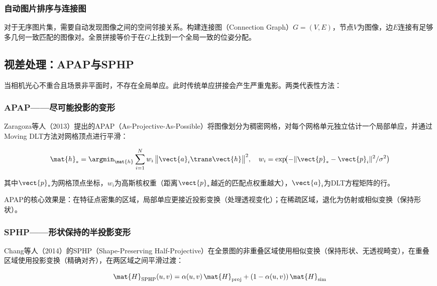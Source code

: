 \subsubsection{自动图片排序与连接图}

对于无序图片集，需要自动发现图像之间的空间邻接关系。构建连接图（Connection Graph）$G = (V, E)$，节点$V$为图像，边$E$连接有足够多几何一致匹配的图像对。全景拼接等价于在$G$上找到一个全局一致的位姿分配。

\subsection{视差处理：APAP与SPHP}
\label{sec:parallax}

当相机光心不重合且场景非平面时，不存在全局单应。此时传统单应拼接会产生严重鬼影。两类代表性方法：

\subsubsection{APAP——尽可能投影的变形}

Zaragoza等人（2013）提出的APAP（As-Projective-As-Possible）将图像划分为稠密网格，对每个网格单元独立估计一个局部单应，并通过Moving DLT方法对网格顶点进行平滑：

\begin{equation}
\mat{h}_* = \argmin_{\mat{h}} \sum_{i=1}^{N}
w_i\,\bigl\|\vect{a}_i\trans\vect{h}\bigr\|^2,
\quad
w_i = \exp\!\bigl(-\|\vect{p}_* - \vect{p}_i\|^2 / \sigma^2\bigr)
\label{eq:apap-weight}
\end{equation}

其中$\vect{p}_*$为网格顶点坐标，$w_i$为高斯核权重（距离$\vect{p}_*$越近的匹配点权重越大），$\vect{a}_i$为DLT方程矩阵的行。

APAP的核心效果是：在特征点密集的区域，局部单应更接近投影变换（处理透视变化）；在稀疏区域，退化为仿射或相似变换（保持形状）。

\subsubsection{SPHP——形状保持的半投影变形}

Chang等人（2014）的SPHP（Shape-Preserving Half-Projective）在全景图的非重叠区域使用相似变换（保持形状、无透视畸变），在重叠区域使用投影变换（精确对齐），在两区域之间平滑过渡：

\begin{equation}
\mat{H}_{\text{SPHP}}(u,v) = \alpha(u,v)\,\mat{H}_{\text{proj}}
                          + (1 - \alpha(u,v))\,\mat{H}_{\text{sim}}
\label{eq:sphp}
\end{equation}

